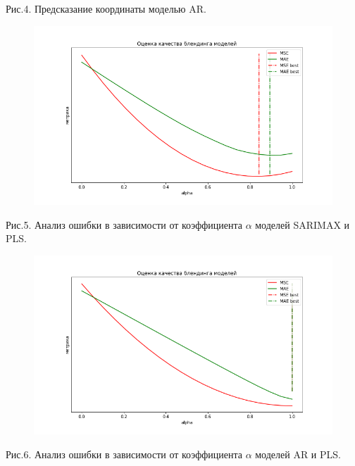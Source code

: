 \documentclass{article}
\begin{document}
Рис.4. Предсказание координаты моделью AR.
\begin{figure}[H]
\includegraphics[scale=0.34]{images/5.png}
\end{figure}
Рис.5. Анализ ошибки в зависимости от коэффициента $\alpha$ моделей SARIMAX и PLS.
\begin{figure}[H]
\includegraphics[scale=0.34]{images/6.png}
\end{figure}
Рис.6. Анализ ошибки в зависимости от коэффициента $\alpha$ моделей AR и PLS.
\end{document}
